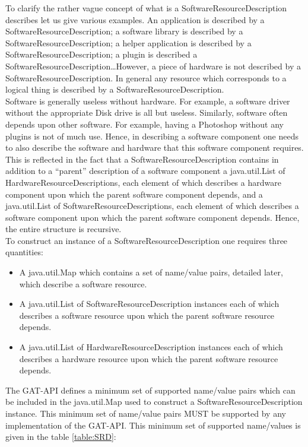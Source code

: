 \documentclass[$Date: 2003/06/26 19:29:31 $]{glabarticle}
\begin{document}
To clarify the rather vague concept of what is a
SoftwareResourceDescription describes let us give various examples. An
application is described by a SoftwareResourceDescription; a software
library is described by a SoftwareResourceDescription; a helper
application is described by a SoftwareResourceDescription; a plugin is
described a SoftwareResourceDescription\ldots However, a piece of
hardware is not described by a SoftwareResourceDescription. In general
any resource which corresponds to a logical thing is described by a
SoftwareResourceDescription. \\

Software is generally useless without hardware. For example, a
software driver without the appropriate Disk drive is all but
useless. Similarly, software often depends upon other software. For
example, having a Photoshop without any plugins is not of much
use. Hence, in describing a software component one needs to also
describe the software and hardware that this software component
requires. This is reflected in the fact that a
SoftwareResourceDescription contains in addition to a ``parent''
description of a software component a java.util.List of
HardwareResourceDescriptions, each element of which describes a
hardware component upon which the parent software component depends,
and a java.util.List of SoftwareResourceDescriptions, each element of which
describes a software component upon which the parent software
component depends. Hence, the entire structure is recursive. \\

To construct an instance of a SoftwareResourceDescription one requires three quantities:
\begin{itemize}
  \item A java.util.Map which contains a set of name/value pairs, detailed later, which describe a software
   resource.
  \item A java.util.List of SoftwareResourceDescription instances each of which describes a software resource upon
  which the parent software resource depends.
  \item A java.util.List of HardwareResourceDescription instances each of which describes a hardware 
  resource upon which the parent software resource depends.
\end{itemize}

The GAT-API defines a minimum set of supported name/value pairs which
can be included in the java.util.Map used to construct a
SoftwareResourceDescription instance. This minimum set of name/value
pairs MUST be supported by any implementation of the GAT-API. This
minimum set of supported name/values is given in the table
\ref{table:SRD}:
\end{document}
